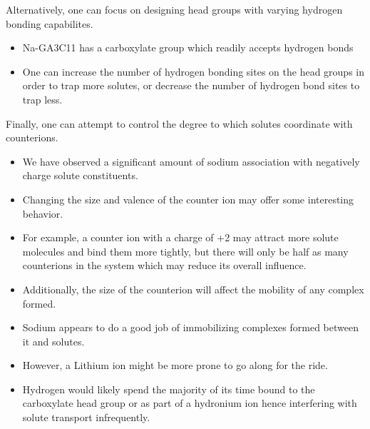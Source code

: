\documentclass{article}
\begin{document}
  Alternatively, one can focus on designing head groups with varying hydrogen 
  bonding capabilites.
  \begin{itemize}
    \item Na-GA3C11 has a carboxylate group which readily accepts hydrogen bonds
    \item One can increase the number of hydrogen bonding sites on the head groups
    in order to trap more solutes, or decrease the number of hydrogen bond sites
    to trap less.
  \end{itemize}
  
  Finally, one can attempt to control the degree to which solutes coordinate 
  with counterions.
  \begin{itemize}
    \item We have observed a significant amount of sodium association with 
    negatively charge solute constituents.
    \item Changing the size and valence of the counter ion may offer some
    interesting behavior. 
    \item For example, a counter ion with a charge of +2 may attract more solute
    molecules and bind them more tightly, but there will only be half as many
    counterions in the system which may reduce its overall influence.
    \item Additionally, the size of the counterion will affect the mobility
    of any complex formed. 
    \item Sodium appears to do a good job of immobilizing complexes formed between
    it and solutes. 
    \item However, a Lithium ion might be more prone to go along for the ride.
    \item Hydrogen would likely spend the majority of its time bound to the 
    carboxylate head group or as part of a hydronium ion hence interfering with 
    solute transport infrequently.
  \end{itemize}
  
  
\end{document}
